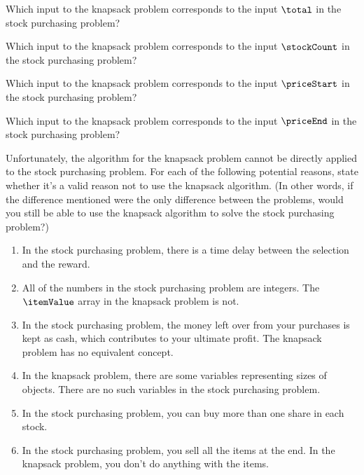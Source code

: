 \documentclass[12pt,twoside]{article}
\newcommand{\answerIId}{\solution{
4
}}
\newcommand{\answerIIe}{\solution{
1
}}
\newcommand{\answerIIf}{\solution{
2
}}
\newcommand{\answerIIg}{\solution{
3
}}
\begin{document}
\begin{problems}
{}

\begin{problemparts}

\problempart
{}
Which input to the knapsack problem
corresponds to the input $\total$ in the stock purchasing problem?
\knapsackAnswers
\answerIId

\problempart
{}
Which input to the knapsack problem
corresponds to the input $\stockCount$ in the stock purchasing problem?
\knapsackAnswers
\answerIIe

\problempart
{}
Which input to the knapsack problem
corresponds to the input $\priceStart$ in the stock purchasing problem?
\knapsackAnswers
\answerIIf

\problempart
{}
Which input to the knapsack problem
corresponds to the input $\priceEnd$ in the stock purchasing problem?
\knapsackAnswers
\answerIIg

\problempart
{}
Unfortunately,
the algorithm for the knapsack problem
cannot be directly applied to the stock purchasing problem.
For each of the following potential reasons,
state whether it's a valid reason
not to use the knapsack algorithm.
(In other words, if the difference mentioned
were the only difference between the problems,
would you still be able to use the knapsack algorithm
to solve the stock purchasing problem?)

\begin{enumerate}
\item
In the stock purchasing problem,
there is a time delay between the selection
and the reward.

\item
All of the numbers in the stock purchasing problem are integers.
The $\itemValue$ array in the knapsack problem is not.

\item 
In the stock purchasing problem,
the money left over from your purchases
is kept as cash,
which contributes to your ultimate profit.
The knapsack problem has no equivalent concept.

\item
In the knapsack problem,
there are some variables representing
sizes of objects.
There are no such variables
in the stock purchasing problem.

\item
In the stock purchasing problem,
you can buy more than one share in each stock.

\item
In the stock purchasing problem,
you sell all the items at the end.
In the knapsack problem,
you don't do anything with the items.
 

\end{enumerate}
\end{problemparts}
\end{problems}
\end{document}
